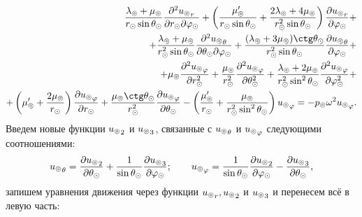 \begin{equation*}
\begin{split}
\fr{\la\l+\mu\l}{r\s\sin\Q\s} \fr{\de^2{u\l}_r}{\de r\s \de \f\s} + \left(\fr{\mu'\l}{r\s\sin\Q\s} + \fr{2\la\l+4\mu\l}{r\s^2\sin\Q\s} \right)\fr{\de {u\l}_r}{\de \f\s} +\\
+ \fr{\la\l+\mu\l}{r\s^2\sin\Q\s}\fr{\de^2 {u\l}_\Q}{\de \Q\s \de \f\s} + \fr{(\la\l+3\mu\l)\ctg\Q\s}{r\s^2\sin\Q\s}\fr{\de {u\l}_\Q}{\de \f\s} +\\
+ \mu\l \fr{\de^2 {u\l}_\f}{\de r\s^2} + \fr{\mu\l}{r\s^2}\fr{\de^2 {u\l}_\f}{\de \Q\s^2} + \fr{\la\l+2\mu\l}{r\s^2\sin^2\Q\s} \fr{\de^2 {u\l}_\f}{\de \f\s^2} + \\
+ \left(\mu'\l+\fr{2\mu\l}{r\s}\right)\fr{\de {u\l}_\f}{\de r\s} + \fr{\mu\l\ctg\Q\s}{r\s^2}\fr{\de {u\l}_\f}{\de \Q\s} - \left(\fr{\mu'\l}{r\s} + \fr{\mu\l}{r\s^2\sin^2\Q\s}\right){u\l}_\f = - p\l\om^2{u\l}_\f.
\end{split}
\end{equation*}
Введем новые функции ${u_\circledcirc}_2$ и ${u_\circledcirc}_3$, связанные с ${u_\circledcirc}_\theta$ и ${u_\circledcirc}_\varphi$ следующими соотношениями:
\begin{equation}\label{eq_v2v3}
{u_\circledcirc}_\theta = \dfrac{\partial {u_\circledcirc}_2}{\partial\theta_\odot} + \frac1{\sin\theta_\odot}\frac{\partial {u_\circledcirc}_3}{\partial\varphi_\odot}; \qquad {u_\circledcirc}_\varphi = \dfrac1{\sin\theta_\odot}\dfrac{\partial {u_\circledcirc}_2}{\partial\varphi_\odot} - \dfrac{\partial {u_\circledcirc}_3}{\partial\theta_\odot},
\end{equation}
запишем уравнения движения через функции ${u_\circledcirc}_r, {u_\circledcirc}_2$ и ${u_\circledcirc}_3$ и перенесем всё в левую часть:

